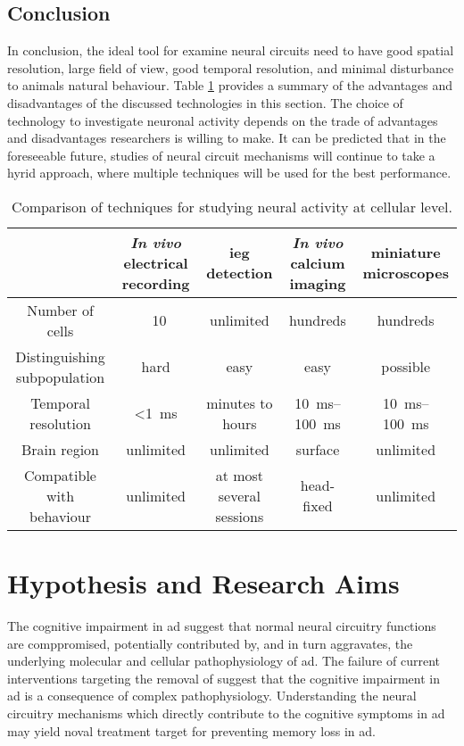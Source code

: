 \subsection{Conclusion}

In conclusion, the ideal tool for examine neural circuits need to have good spatial resolution, large field of view, good temporal resolution, and minimal disturbance to animals natural behaviour. Table \ref{tech-compare} provides a summary of the advantages and disadvantages of the discussed technologies in this section. The choice of technology to investigate neuronal activity depends on the trade of advantages and disadvantages researchers is willing to make. It can be predicted that in the foreseeable future, studies of neural circuit mechanisms will continue to take a hyrid approach, where multiple techniques will be used for the best performance. 

\begin{table}
    \centering
    \begin{tabular}{| c | c | c | c | c |}
        \hline
        & \textit{In vivo} electrical recording & \Gls{ieg} detection & \textit{In vivo} calcium imaging & miniature microscopes \\ \hline
        Number of cells & ~10 & unlimited & hundreds & hundreds \\ \hline
        Distinguishing subpopulation & hard & easy & easy & possible \\ \hline
        Temporal resolution & <\SI{1}{\ms} & minutes to hours & \SIrange{10}{100}{\ms} & \SIrange{10}{100}{\ms} \\ \hline
        Brain region & unlimited & unlimited & surface & unlimited \\ \hline
        Compatible with behaviour & unlimited & at most several sessions & head-fixed & unlimited \\ \hline
    \end{tabular}
    \caption{Comparison of techniques for studying neural activity at cellular level. \label{tech-compare}} 
\end{table}

\section{Hypothesis and Research Aims}

The cognitive impairment in \gls{ad} suggest that normal neural circuitry functions are comppromised, potentially contributed by, and in turn aggravates, the underlying molecular and cellular pathophysiology of \gls{ad}. The failure of current interventions targeting the removal of \abeta{} suggest that the cognitive impairment in \gls{ad} is a consequence of complex pathophysiology. Understanding the neural circuitry mechanisms which directly contribute to the cognitive symptoms in \gls{ad} may yield noval treatment target for preventing memory loss in \gls{ad}. 

